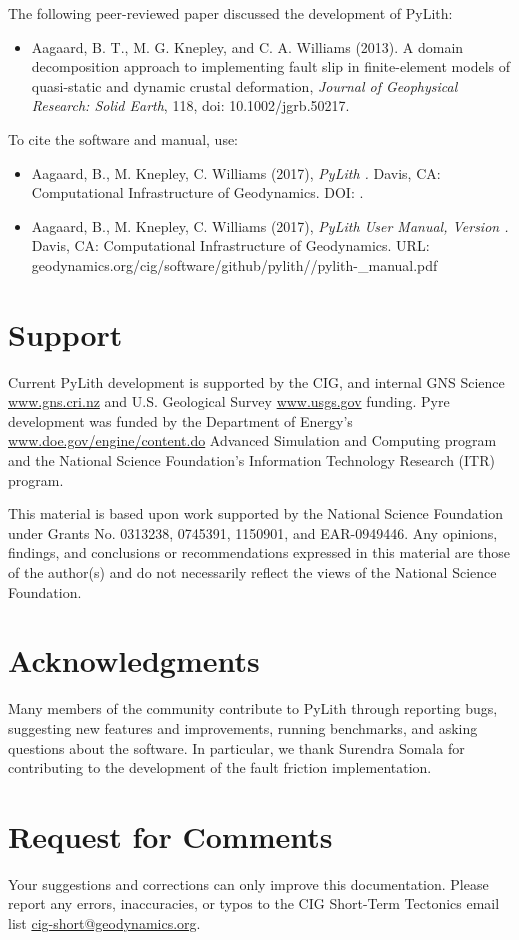 The following peer-reviewed paper discussed the development of PyLith:
\begin{itemize}
\item Aagaard, B. T., M. G. Knepley, and C. A. Williams (2013). A
  domain decomposition approach to implementing fault slip in
  finite-element models of quasi-static and dynamic crustal
  deformation, \textit{Journal of Geophysical Research: Solid Earth},
  118, doi: 10.1002/jgrb.50217.
\end{itemize}
To cite the software and manual, use:
\begin{itemize}
\item Aagaard, B., M. Knepley, C. Williams (2017), \emph{PyLith
  \pylithVersion.} Davis, CA: Computational Infrastructure of
  Geodynamics. DOI: \pylithDOI.
\item Aagaard, B., M. Knepley, C. Williams (2017), \emph{PyLith User
  Manual, Version \pylithVersionNumber.} Davis, CA: Computational
  Infrastructure of Geodynamics. URL:
  geodynamics.org/cig/software/github/pylith/\pylithVersion/pylith-\pylithVersionNumber\_manual.pdf
\end{itemize}

\section{Support}

Current PyLith development is supported by the CIG, and internal GNS
Science \url{www.gns.cri.nz} and U.S. Geological Survey \url{www.usgs.gov}
funding. Pyre development was funded by the Department of Energy's
\url{www.doe.gov/engine/content.do} Advanced Simulation and Computing
program and the National Science Foundation's Information Technology
Research (ITR) program.

This material is based upon work supported by the National Science
Foundation under Grants No. 0313238, 0745391, 1150901, and
EAR-0949446. Any opinions, findings, and conclusions or
recommendations expressed in this material are those of the author(s)
and do not necessarily reflect the views of the National Science
Foundation.


\section{Acknowledgments}

Many members of the community contribute to PyLith through reporting
bugs, suggesting new features and improvements, running benchmarks,
and asking questions about the software. In particular, we thank Surendra
Somala for contributing to the development of the fault friction implementation.


\section{Request for Comments}

Your suggestions and corrections can only improve this documentation.
Please report any errors, inaccuracies, or typos to the CIG Short-Term
Tectonics email list \url{cig-short@geodynamics.org}. 
